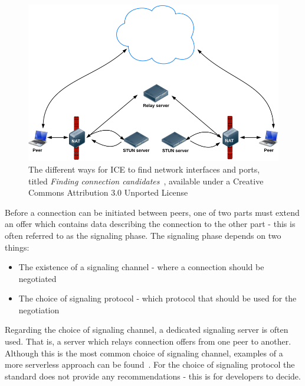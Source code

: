 \begin{figure}[htp]
\centering
\includegraphics[width=\textwidth,height=0.25\paperheight,keepaspectratio
]{figures/ICE}
\caption{{The different ways for ICE to find network interfaces and ports, titled \emph{Finding connection candidates}~\cite{WebRTCBasics:2012:Online}, available under a Creative Commons Attribution 3.0 Unported License\protect\footnotemark}}
\label{fig:ICE}
\end{figure}


Before a connection can be initiated between peers, one of two parts must extend an offer which contains data describing the connection to the other part - this is often referred to as the signaling phase. The signaling phase depends on two things:

\begin{itemize}
  \item The existence of a signaling channel - where a connection should be negotiated
  \item The choice of signaling protocol - which protocol that should be used for the negotiation
\end{itemize}

Regarding the choice of signaling channel, a dedicated signaling server is often used. That is, a server which relays connection offers from one peer to another. Although this is the most common choice of signaling channel, examples of a more serverless approach can be found~\cite{webrtcsignalserver}. For the choice of signaling protocol the standard does not provide any recommendations - this is for developers to decide.

